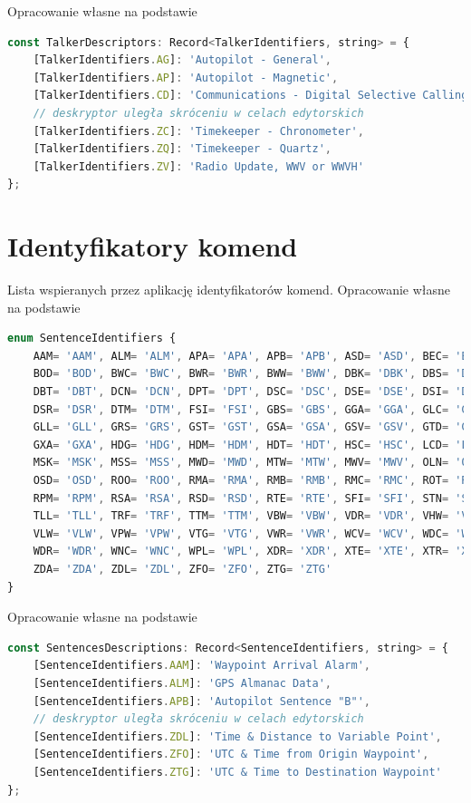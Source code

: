 \documentclass[skorowidz,skroty]{dyplomWEZUT}
\begin{document}
{Opracowanie własne na podstawie \cite{gpsinformation, Raymond2019}}{\label{code: talkers descriptors}}
\begin{lstlisting}[language=JavaScript]
const TalkerDescriptors: Record<TalkerIdentifiers, string> = {
    [TalkerIdentifiers.AG]: 'Autopilot - General',
    [TalkerIdentifiers.AP]: 'Autopilot - Magnetic',
    [TalkerIdentifiers.CD]: 'Communications - Digital Selective Calling (DSC)',
    // deskryptor uległa skróceniu w celach edytorskich
    [TalkerIdentifiers.ZC]: 'Timekeeper - Chronometer',
    [TalkerIdentifiers.ZQ]: 'Timekeeper - Quartz',
    [TalkerIdentifiers.ZV]: 'Radio Update, WWV or WWVH'
};
\end{lstlisting}

\section{Identyfikatory komend}\label{sec:sentence ids}
Lista wspieranych przez aplikację identyfikatorów komend.
{Opracowanie własne na podstawie \cite{gpsinformation, Raymond2019}}{\label{code:Sentences enum}}
\begin{lstlisting}[language=JavaScript]
enum SentenceIdentifiers {
    AAM= 'AAM', ALM= 'ALM', APA= 'APA', APB= 'APB', ASD= 'ASD', BEC= 'BEC',
    BOD= 'BOD', BWC= 'BWC', BWR= 'BWR', BWW= 'BWW', DBK= 'DBK', DBS= 'DBS',
    DBT= 'DBT', DCN= 'DCN', DPT= 'DPT', DSC= 'DSC', DSE= 'DSE', DSI= 'DSI',
    DSR= 'DSR', DTM= 'DTM', FSI= 'FSI', GBS= 'GBS', GGA= 'GGA', GLC= 'GLC',
    GLL= 'GLL', GRS= 'GRS', GST= 'GST', GSA= 'GSA', GSV= 'GSV', GTD= 'GTD',
    GXA= 'GXA', HDG= 'HDG', HDM= 'HDM', HDT= 'HDT', HSC= 'HSC', LCD= 'LCD',
    MSK= 'MSK', MSS= 'MSS', MWD= 'MWD', MTW= 'MTW', MWV= 'MWV', OLN= 'OLN',
    OSD= 'OSD', ROO= 'ROO', RMA= 'RMA', RMB= 'RMB', RMC= 'RMC', ROT= 'ROT',
    RPM= 'RPM', RSA= 'RSA', RSD= 'RSD', RTE= 'RTE', SFI= 'SFI', STN= 'STN',
    TLL= 'TLL', TRF= 'TRF', TTM= 'TTM', VBW= 'VBW', VDR= 'VDR', VHW= 'VHW',
    VLW= 'VLW', VPW= 'VPW', VTG= 'VTG', VWR= 'VWR', WCV= 'WCV', WDC= 'WDC',
    WDR= 'WDR', WNC= 'WNC', WPL= 'WPL', XDR= 'XDR', XTE= 'XTE', XTR= 'XTR',
    ZDA= 'ZDA', ZDL= 'ZDL', ZFO= 'ZFO', ZTG= 'ZTG'
}
\end{lstlisting}

{Opracowanie własne na podstawie \cite{gpsinformation, Raymond2019}}{\label{code: sentences descriptors}}
\begin{lstlisting}[language=JavaScript]
const SentencesDescriptions: Record<SentenceIdentifiers, string> = {
    [SentenceIdentifiers.AAM]: 'Waypoint Arrival Alarm',
    [SentenceIdentifiers.ALM]: 'GPS Almanac Data',
    [SentenceIdentifiers.APB]: 'Autopilot Sentence "B"',
    // deskryptor uległa skróceniu w celach edytorskich
    [SentenceIdentifiers.ZDL]: 'Time & Distance to Variable Point',
    [SentenceIdentifiers.ZFO]: 'UTC & Time from Origin Waypoint',
    [SentenceIdentifiers.ZTG]: 'UTC & Time to Destination Waypoint'
};
\end{lstlisting}
\end{document}
